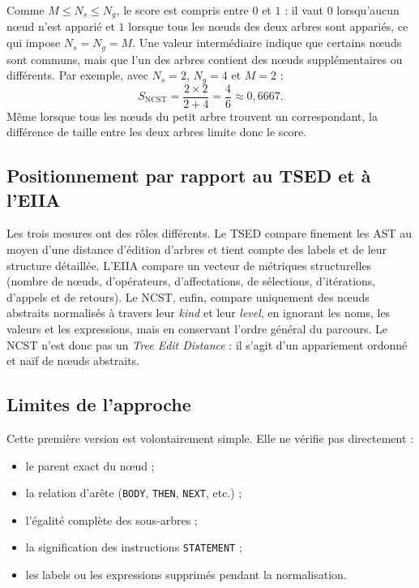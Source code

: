 {Comme $M \leq N_s \leq N_g$, le score est compris entre $0$ et $1$ : il vaut
$0$ lorsqu'aucun nœud n'est apparié et $1$ lorsque tous les nœuds des deux
arbres sont appariés, ce qui impose $N_s = N_g = M$. Une valeur intermédiaire
indique que certains nœuds sont communs, mais que l'un des arbres contient des
nœuds supplémentaires ou différents. Par exemple, avec $N_s = 2$, $N_g = 4$ et
$M = 2$ :
\begin{equation}
S_{\mathrm{NCST}} = \frac{2\times 2}{2+4} = \frac{4}{6} \approx 0{,}6667.
\end{equation}
Même lorsque tous les nœuds du petit arbre trouvent un correspondant, la
différence de taille entre les deux arbres limite donc le score.

\subsection{Positionnement par rapport au TSED et à l'EIIA}

Les trois mesures ont des rôles différents. Le TSED compare finement les AST au
moyen d'une distance d'édition d'arbres et tient compte des labels et de leur
structure détaillée. L'EIIA compare un vecteur de métriques structurelles
(nombre de nœuds, d'opérateurs, d'affectations, de sélections, d'itérations,
d'appels et de retours). Le NCST, enfin, compare uniquement des nœuds abstraits
normalisés à travers leur \emph{kind} et leur \emph{level}, en ignorant les
noms, les valeurs et les expressions, mais en conservant l'ordre général du
parcours. Le NCST n'est donc pas un \emph{Tree Edit Distance} : il s'agit d'un
appariement ordonné et naïf de nœuds abstraits.

\subsection{Limites de l'approche}

Cette première version est volontairement simple. Elle ne vérifie pas
directement :
\begin{itemize}
  \item le parent exact du nœud ;
  \item la relation d'arête (\texttt{BODY}, \texttt{THEN}, \texttt{NEXT}, etc.) ;
  \item l'égalité complète des sous-arbres ;
  \item la signification des instructions \texttt{STATEMENT} ;
  \item les labels ou les expressions supprimés pendant la normalisation.
\end{itemize}

}
